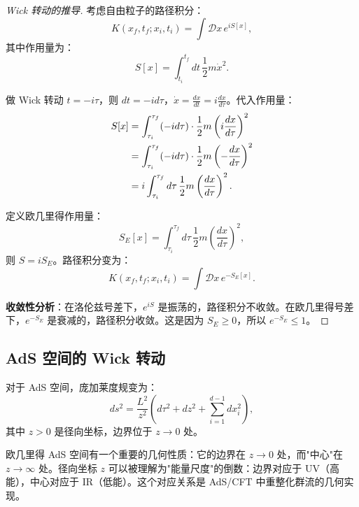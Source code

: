 \begin{proof}[Wick 转动的推导]
考虑自由粒子的路径积分：
\begin{equation}
    K(x_f, t_f; x_i, t_i) = \int \mathcal{D}x \, e^{iS[x]},
\end{equation}
其中作用量为：
\begin{equation}
    S[x] = \int_{t_i}^{t_f} dt \, \frac{1}{2} m \dot{x}^2.
\end{equation}

做 Wick 转动 $t = -i\tau$，则 $dt = -id\tau$，$\dot{x} = \frac{dx}{dt} = i\frac{dx}{d\tau}$。代入作用量：
\begin{align}
    S[x] &= \int_{\tau_i}^{\tau_f} (-id\tau) \cdot \frac{1}{2} m \left(i\frac{dx}{d\tau}\right)^2 \notag \\
         &= \int_{\tau_i}^{\tau_f} (-id\tau) \cdot \frac{1}{2} m \left(-\frac{dx}{d\tau}\right)^2 \notag \\
         &= i \int_{\tau_i}^{\tau_f} d\tau \, \frac{1}{2} m \left(\frac{dx}{d\tau}\right)^2.
\end{align}

定义欧几里得作用量：
\begin{equation}
    S_E[x] = \int_{\tau_i}^{\tau_f} d\tau \, \frac{1}{2} m \left(\frac{dx}{d\tau}\right)^2,
\end{equation}
则 $S = iS_E$。路径积分变为：
\begin{equation}
    K(x_f, t_f; x_i, t_i) = \int \mathcal{D}x \, e^{-S_E[x]}.
\end{equation}

\textbf{收敛性分析}：在洛伦兹号差下，$e^{iS}$ 是振荡的，路径积分不收敛。在欧几里得号差下，$e^{-S_E}$ 是衰减的，路径积分收敛。这是因为 $S_E \geq 0$，所以 $e^{-S_E} \leq 1$。
\end{proof}

\subsection{AdS 空间的 Wick 转动}

对于 AdS 空间，庞加莱度规变为：
\begin{equation}
    ds^2 = \frac{L^2}{z^2} \left( d\tau^2 + dz^2 + \sum_{i=1}^{d-1} dx_i^2 \right),
\end{equation}
其中 $z > 0$ 是径向坐标，边界位于 $z \to 0$ 处。

\begin{note}
欧几里得 AdS 空间有一个重要的几何性质：它的边界在 $z \to 0$ 处，而"中心"在 $z \to \infty$ 处。径向坐标 $z$ 可以被理解为"能量尺度"的倒数：边界对应于 UV（高能），中心对应于 IR（低能）。这个对应关系是 AdS/CFT 中重整化群流的几何实现。
\end{note}

